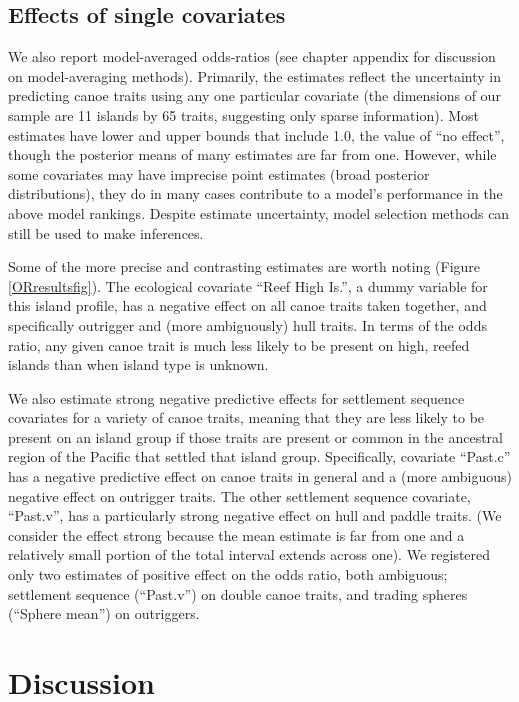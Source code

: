  \subsection{Effects of single covariates}   

We also report model-averaged odds-ratios (see chapter appendix for discussion on model-averaging methods). Primarily, the estimates reflect the uncertainty in predicting canoe traits using any one particular covariate (the dimensions of our sample are 11 islands by 65 traits, suggesting only sparse information). Most estimates have lower and upper bounds that include 1.0, the value of ``no effect'', though the posterior means of many estimates are far from one.  However, while some covariates may have imprecise point estimates (broad posterior distributions), they do in many cases contribute to a model's performance in the above model rankings.  Despite estimate uncertainty, model selection methods can still be used to make inferences.  

Some of the more precise and contrasting estimates are worth noting (Figure \ref{ORresultsfig}). The ecological covariate ``Reef High Is.'', a dummy variable for this island profile, has a negative effect on all canoe traits taken together, and specifically outrigger and (more ambiguously) hull traits.  In terms of the odds ratio, any given canoe trait is much less likely to be present on high, reefed islands than when island type is unknown.  

We also estimate strong negative predictive effects for settlement sequence covariates for a variety of canoe traits, meaning that they are less likely to be present on an island group if those traits are present or common in the ancestral region of the Pacific that settled that island group.  Specifically, covariate ``Past.c'' has a negative predictive effect on canoe traits in general and a (more ambiguous) negative effect on outrigger traits.  The other settlement sequence covariate, ``Past.v'', has a particularly strong negative effect on hull and paddle traits.  (We consider the effect strong because the mean estimate is far from one and a relatively small portion of the total interval extends across one).  We registered only two estimates of positive effect on the odds ratio, both ambiguous; settlement sequence (``Past.v'') on double canoe traits, and trading spheres (``Sphere mean'') on outriggers.  


\section{Discussion}

